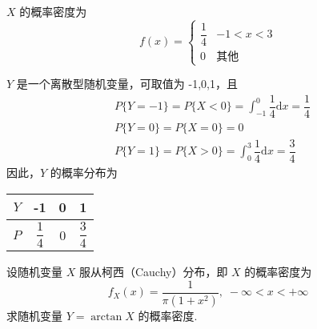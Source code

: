 \begin{solution}
    $X$ 的概率密度为
    $$
    f(x)=\begin{cases}
        \dfrac{1}{4} & -1 < x < 3\\
        0 & \text{其他}
    \end{cases}
    $$

    $Y$ 是一个离散型随机变量，可取值为 -1,0,1，且
    \begin{align*}
        & P\{Y=-1\} = P\{X<0\} = \int_{-1}^0 \dfrac{1}{4}\text{d}x = \dfrac{1}{4} \\
        & P\{Y=0\} = P\{X=0\} = 0 \\
        & P\{Y=1\} = P\{X>0\} = \int_0^3 \dfrac{1}{4}\text{d}x = \dfrac{3}{4}
    \end{align*}
    因此，$Y$ 的概率分布为\newline

    \centering
    \begin{tabular}{c | c c c}
        \hline
        $Y$ & -1 & 0 & 1 \\
        \hline
        \rule{0pt}{20pt}$P$ & $\dfrac{1}{4}$ & 0 & $\dfrac{3}{4}$ \\[4pt]
        \hline
    \end{tabular}
\end{solution}

\begin{problem}
    设随机变量 $X$ 服从柯西（Cauchy）分布，即 $X$ 的概率密度为
    $$
    f_{X}(x) = \dfrac{1}{\pi (1+x^2)}, \; -\infty < x < +\infty
    $$
    求随机变量 $Y=\arctan X$ 的概率密度.
\end{problem}

